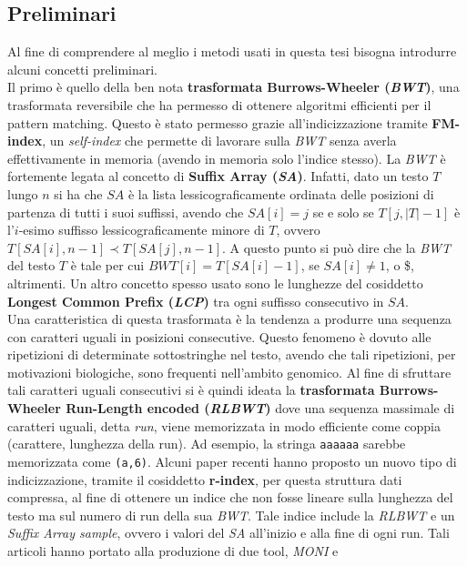 \documentclass[a4paper,11pt, oneside,italian]{article}
\begin{document}
\subsection*{Preliminari}
Al fine di comprendere al meglio i metodi usati in questa tesi bisogna
introdurre alcuni concetti preliminari.\\
Il primo è quello della ben nota \textbf{trasformata Burrows-Wheeler
  (\textit{BWT})}, una trasformata reversibile che ha permesso di ottenere
algoritmi efficienti per il pattern matching. Questo è stato permesso grazie
all'indicizzazione tramite 
\textbf{FM-index}, un \textit{self-index} che permette di lavorare sulla
\textit{BWT} senza averla effettivamente in memoria (avendo in memoria solo
l'indice stesso). La \textit{BWT} è fortemente legata al concetto di
\textbf{Suffix Array (\textit{SA})}. Infatti, dato un testo $T$ lungo $n$ si ha
che $SA$ è la lista lessicograficamente ordinata delle posizioni di partenza di
tutti i suoi suffissi, avendo che $SA[i]=j$ se e solo se $T[j, |T|-1]$ è
l'$i$-esimo 
suffisso lessicograficamente minore di $T$, ovvero $T[SA[i],n-1] \prec 
T[SA[j],n-1]$. A questo punto si può dire che la \textit{BWT} del testo $T$ è
tale per cui $BWT[i]=T[SA[i]-1]$, se $SA[i]\neq 1$, o \$, altrimenti. Un altro
concetto spesso usato 
sono le lunghezze del cosiddetto \textbf{Longest Common Prefix (\textit{LCP})}
tra ogni suffisso consecutivo in $SA$.\\
Una caratteristica di questa trasformata è la tendenza a
produrre una sequenza con caratteri uguali in posizioni
consecutive. Questo fenomeno è dovuto alle ripetizioni di determinate
sottostringhe nel testo, avendo che tali ripetizioni, per motivazioni
biologiche, sono frequenti nell'ambito genomico. Al fine di sfruttare tali
caratteri uguali consecutivi si 
è quindi ideata la \textbf{trasformata Burrows-Wheeler Run-Length encoded
  (\textit{RLBWT})} dove una sequenza massimale di caratteri uguali, detta
\textit{run}, viene memorizzata in modo efficiente come coppia (carattere,
lunghezza della run). Ad esempio, la stringa \texttt{aaaaaa} sarebbe memorizzata
come \texttt{(a,6)}. Alcuni paper recenti hanno proposto un nuovo tipo di
indicizzazione, tramite il cosiddetto \textbf{r-index}, per questa struttura
dati compressa, al fine di ottenere un indice che non fosse lineare sulla
lunghezza del testo ma sul numero di run della sua \textit{BWT}.
Tale indice include la \textit{RLBWT} e un \textit{Suffix Array sample},
ovvero i valori del \textit{SA} all’inizio e alla fine di ogni run. Tali
articoli hanno portato alla produzione di due tool, \textit{MONI} e 
\end{document}
